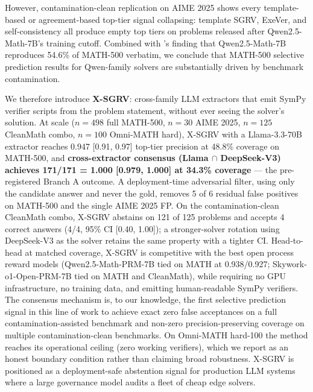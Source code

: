 \documentclass{article}
\begin{document}
However, contamination-clean replication on AIME 2025 shows every template-based or agreement-based top-tier signal collapsing: template SGRV, ExeVer, and self-consistency all produce empty top tiers on problems released after Qwen2.5-Math-7B's training cutoff. Combined with \citet{wu2025contam}'s finding that Qwen2.5-Math-7B reproduces 54.6\% of MATH-500 verbatim, we conclude that MATH-500 selective prediction results for Qwen-family solvers are substantially driven by benchmark contamination.

We therefore introduce \textbf{X-SGRV}: cross-family LLM extractors that emit SymPy verifier scripts from the problem statement, without ever seeing the solver's solution. At scale ($n{=}498$ full MATH-500, $n{=}30$ AIME 2025, $n{=}125$ CleanMath combo, $n{=}100$ Omni-MATH hard), X-SGRV with a Llama-3.3-70B extractor reaches 0.947 [0.91, 0.97] top-tier precision at 48.8\% coverage on MATH-500, and \textbf{cross-extractor consensus (Llama $\cap$ DeepSeek-V3) achieves 171/171 = 1.000 [0.979, 1.000] at 34.3\% coverage} --- the pre-registered Branch A outcome. A deployment-time adversarial filter, using only the candidate answer and never the gold, removes 5 of 6 residual false positives on MATH-500 and the single AIME 2025 FP. On the contamination-clean CleanMath combo, X-SGRV abstains on 121 of 125 problems and accepts 4 correct answers (4/4, 95\% CI [0.40, 1.00]); a stronger-solver rotation using DeepSeek-V3 as the solver retains the same property with a tighter CI. Head-to-head at matched coverage, X-SGRV is competitive with the best open process reward models (Qwen2.5-Math-PRM-7B tied on MATH at 0.938/0.927; Skywork-o1-Open-PRM-7B tied on MATH and CleanMath), while requiring no GPU infrastructure, no training data, and emitting human-readable SymPy verifiers. The consensus mechanism is, to our knowledge, the first selective prediction signal in this line of work to achieve exact zero false acceptances on a full contamination-assisted benchmark and non-zero precision-preserving coverage on multiple contamination-clean benchmarks. On Omni-MATH hard-100 the method reaches its operational ceiling (zero working verifiers), which we report as an honest boundary condition rather than claiming broad robustness. X-SGRV is positioned as a deployment-safe abstention signal for production LLM systems where a large governance model audits a fleet of cheap edge solvers.




\appendix
\end{document}

